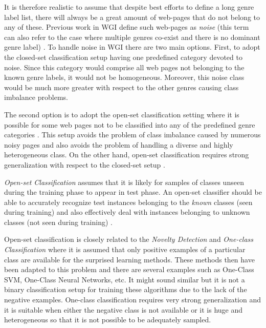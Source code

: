 It is therefore realistic to assume that despite best efforts to define a long genre label list, there will always be a great amount of web-pages that do not belong to any of these. Previous work in WGI define such web-pages as \textit{noise} (this term can also refer to the case where multiple genres co-exist and there is no dominant genre label) \parencite{santini2011cross,levering2008using}. To handle noise in WGI there are two main options. First, to adopt the closed-set classification setup having one predefined category devoted to noise. Since this category would comprise all web pages not belonging to the known genre labels, it would not be homogeneous. Moreover, this noise class would be much more greater with respect to the other genres causing class imbalance problems. 

The second option is to adopt the open-set classification setting where it is possible for some web pages not to be classified into any of the predefined genre categories \parencite{pritsos2013open}. This setup avoids the problem of class imbalance caused by numerous noisy pages and also avoids the problem of handling a diverse and highly heterogeneous class. On the other hand, open-set classification requires strong generalization with respect to the closed-set setup \parencite{scheirer2013toward}.

\begin{definition}{\textit{Open-set Classification}}
assumes that it is likely for samples of classes unseen during the training phase to appear in test phase. An open-set classifier should be able to accurately recognize test instances belonging to the \textit{known} classes (seen during training) and also effectively deal with instances belonging to unknown classes (not seen during training) \parencite{geng2018recent}.
\end{definition}

Open-set classification is closely related to the \textit{Novelty Detection} and \textit{One-class Classification} where it is assumed that only positive examples of a particular class are available for the surprised learning methods. These methods then have been adapted to this problem and there are several examples such as One-Class SVM, One-Class Neural Networks, etc. It might sound similar but it is not a binary classification setup for training these algorithms due to the lack of the negative examples. One-class classification requires very strong generalization and it is suitable when either the negative class is not available or it is huge and heterogeneous so that it is not possible to be adequately sampled. 

